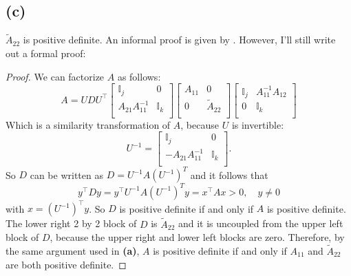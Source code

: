\documentclass[a4paper, 11pt]{article}
\begin{document}
\subsection*{(c)}
$\tilde{A}_{22}$ is positive definite.  An informal proof is given by \cite[p.
175]{tb}. However, I'll still write out a formal proof:
\begin{proof}
  We can factorize $A$ as follows:
  \begin{equation*}
    A = U D U^\top
  \begin{bmatrix}
    \mathbb{I}_j & 0 \\
    A_{21}A_{11}^{-1} & \mathbb{I}_k \\
  \end{bmatrix}
  \begin{bmatrix}
    A_{11} & 0 \\
    0 & \tilde{A}_{22} \\
  \end{bmatrix}
  \begin{bmatrix}
    \mathbb{I}_j & A_{11}^{-1}A_{12} \\
     0 & \mathbb{I}_k \\
  \end{bmatrix}
  \end{equation*}
  Which is a similarity transformation of $A$, because $U$ is invertible:
\begin{equation*}
  U^{-1} = 
  \begin{bmatrix}
    \mathbb{I}_j & 0 \\
    -A_{21}A_{11}^{-1} & \mathbb{I}_k \\
  \end{bmatrix}.
\end{equation*}
So $D$ can be written as $D = U^{-1}A (U^{-1})^T$ and it follows that
\begin{equation*}
  y^\top D y = y^\top U^{-1}A (U^{-1})^T y = x^\top A x > 0, \quad y \neq 0  
\end{equation*}
with $x = (U^{-1})^\top y$. So $D$ is positive definite if and only if $A$ is
positive definite. The lower right 2 by 2 block of $D$ is $\tilde{A}_{22}$ and
it is uncoupled from the upper left block of $D$, because the upper right and
lower left blocks are zero. Therefore, by the same argument used in
\textbf{(a)}, $A$ is positive definite if and only if $A_{11}$ and
$\tilde{A}_{22}$ are both positive definite.
\end{proof}
\end{document}
